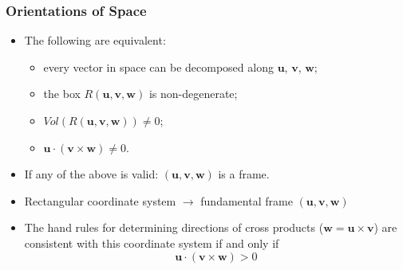 \begin{frame}
\frametitle{Orientations of Space}
\begin{itemize}
\item The following are equivalent:
\begin{itemize}
\item every vector in space can be decomposed along $\textbf{u}$, $\textbf{v}$, $\textbf{w}$;
\item<2-> the box $R(\textbf{u},\textbf{v},\textbf{w})$ is non-degenerate;
\item<3-> $Vol(R(\textbf{u},\textbf{v},\textbf{w})) \neq 0$;
\item<4-> $\textbf{u} \cdot (\textbf{v} \times \textbf{w}) \neq 0$.
\end{itemize}

\item<5-> If any of the above is valid: $(\textbf{u}, \textbf{v}, \textbf{w})$ is a frame.

\item<6-> Rectangular coordinate system $\to$ fundamental frame $(\textbf{u}, \textbf{v}, \textbf{w})$

\item<7-> The hand rules for determining directions of cross products  ($\textbf{w}=\textbf{u} \times \textbf{v}$)  are consistent with this coordinate system if and only if 
\[
\textbf{u} \cdot (\textbf{v} \times \textbf{w}) >0
\]
\end{itemize}
\end{frame}